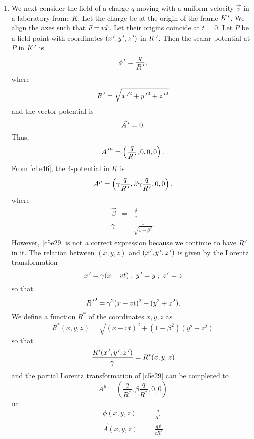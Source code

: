 \begin{enumerate}
\item We next consider the field of a charge $q$ moving with a uniform velocity
$\vec{v}$ in a laboratory frame $K$. Let the charge be at the origin of the 
frame $K^{\,\prime}$.  We align the axes such that $\vec{v} = v\hat{x}$. Let their 
origins coincide at $t = 0$. Let $P$ be a field point with coordinates $(x^{\,\prime},
y^{\,\prime}, z^{\,\prime})$ in $K^{\,\prime}$. Then the scalar potential at $P$ in $K^{\,\prime}$ is
\begin{equation}\label{c5e25}
\phi^{\,\prime} = \frac{q}{R^{\,\prime}},
\end{equation}
where 
\begin{equation}\label{c5e26}
R^{\,\prime} = \sqrt{{x^{\,\prime}}^2 + {y^{\,\prime}}^2 + {z^{\,\prime}}^2}
\end{equation}
and the vector potential is
\begin{equation}\label{c5e27}
\vec{A}^{\,\prime} = 0.
\end{equation}
Thus,
\begin{equation}\label{c5e28}
{A^{\,\prime}}^\mu = \left(\frac{q}{R^{\,\prime}}, 0, 0, 0\right).
\end{equation}
From \eqref{c1e46}, the 4-potential in $K$ is
\begin{equation}\label{c5e29}
A^\mu = \left(\gamma\frac{q}{R^{\,\prime}}, \beta\gamma\frac{q}{R^{\,\prime}}, 0, 0\right),
\end{equation}
where
\begin{eqnarray*}
\vec{\beta} &=& \frac{\vec{v}}{c} \\
\gamma &=& \frac{1}{\sqrt{1 - \beta^2}}.
\end{eqnarray*}
However, \eqref{c5e29} is not a correct expression because we continue to have
$R^{\,\prime}$ in it. The relation between $(x, y, z)$ and $(x^{\,\prime}, y^{\,\prime}, z^{\,\prime})$ is
given by the Lorentz transformation
\[
x^{\,\prime} = \gamma(x - vt) \;;\; y^{\,\prime} = y \;;\; z^{\,\prime} = z
\]
so that
\begin{equation}\label{c5e30}
{R^{\,\prime}}^2 = \gamma^2(x - vt)^2 + (y^2 + z^2).
\end{equation}
We define a function $R^\ast$ of the coordinates $x, y, z$ as
\begin{equation}\label{c5e31}
R^\ast(x, y, z) = \sqrt{(x - vt)^2 + (1 - \beta^2)(y^2 + z^2)}
\end{equation}
so that
\begin{equation}\label{c5e32}
\frac{R^{\,\prime}(x^{\,\prime}, y^{\,\prime}, z^{\,\prime})}{\gamma} = R^\ast(x, y, z)
\end{equation}
and the partial Lorentz transformation of \eqref{c5e29} can be completed to
\begin{equation}\label{c5e33}
A^\mu = \left(\frac{q}{R^\ast}, \beta\frac{q}{R^\ast}, 0, 0\right)
\end{equation}
or
\begin{eqnarray}
\phi(x, y, z) &=& \frac{q}{R^\ast} \label{c5e34} \\
\vec{A}(x, y, z) &=& \frac{q\vec{v}}{cR^\ast} \label{c5e35}
\end{eqnarray}


\end{enumerate}
